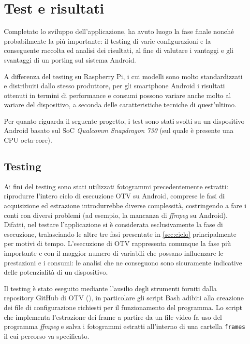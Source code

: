 \chapter{Test e risultati}

Completato lo sviluppo dell'applicazione, ha avuto luogo la fase finale nonché probabilmente la più importante: il testing 
di varie configurazioni e la conseguente raccolta ed analisi dei risultati, al fine di valutare i vantaggi e gli svantaggi di 
un porting sul sistema Android.

A differenza del testing su Raspberry Pi, i cui modelli sono molto standardizzati e distribuiti dallo stesso produttore,
per gli smartphone Android i risultati ottenuti in termini di performance e consumi possono variare anche molto al variare
del dispositivo, a seconda delle caratteristiche tecniche di quest'ultimo.

Per quanto riguarda il seguente progetto, i test sono stati svolti su un dispositivo Android basato sul 
SoC \textit{Qualcomm Snapdragon 730} (sul quale è presente una CPU octa-core).\\

\section{Testing}

Ai fini del testing sono stati utilizzati fotogrammi precedentemente estratti: riprodurre l'intero ciclo di esecuzione OTV
su Android, comprese le fasi di acquisizione ed estrazione introdurrebbe diverse complessità, costringendo a fare i conti con 
diversi problemi (ad esempio, la mancanza di \textit{ffmpeg} su Android).
Difatti, nel testare l'applicazione si è considerata esclusivamente la fase di esecuzione, tralasciando le altre tre fasi
presentate in \autoref{sec:ciclo} principalmente per motivi di tempo. L'esecuzione di OTV rappresenta comunque la fase più
importante e con il maggior numero di variabili che possano influenzare le prestazioni e i consumi: le analisi che ne
conseguono sono sicuramente indicative delle potenzialità di un dispositivo.

Il testing è stato eseguito mediante l'ausilio degli strumenti forniti dalla repository GitHub di OTV (\cite{otvgit}),
in particolare gli script Bash adibiti alla creazione dei file di configurazione richiesti per il funzionamento del programma.
Lo script che implementa l'estrazione dei frame a partire da un file video fa uso del programma
\textit{ffmpeg} e salva i fotogrammi estratti all'interno di una cartella \texttt{frames} il cui percorso va specificato.

